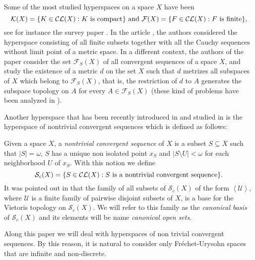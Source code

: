 \documentclass[11pt]{amsart}
\numberwithin{equation}{section}
\theoremstyle{plain}
\theoremstyle{definition}
\theoremstyle{definition}
\theoremstyle{definition}
\theoremstyle{definition}
\theoremstyle{definition}
\begin{document}
\medskip

Some of the most studied hyperspaces on a space $X$ have been
$$
\mathcal{K}(X) = \{K \in \mathcal{CL}(X) : K \textnormal{ is compact}\} \textnormal{ and } \mathcal{F}(X) = \{F \in \mathcal{CL}(X) : F \textnormal{ is finite}\},
$$
see for instance the survey paper \cite{gu}.
In the article \cite{jvpp}, the authors considered the hyperspace consisting of all finite subsets together with all  the Cauchy sequences  without limit point of a metric space.
In a different context,  the authors of the paper \cite{peng} consider the set $\mathcal{F}_S(X)$ of all convergent sequences of a space $X$, and study the existence of a metric $d$ on the set $X$ such that $d$ metrizes all subspaces of $X$ which belong to $\mathcal{F}_S(X)$, that is, the restriction of $d$ to $A$ generates the subspace topology on $A$ for every $A \in \mathcal{F}_S(X)$ (these kind of problems have been analyzed in \cite{arh}).

\medskip

 Another hyperspace that has been recently introduced in \cite{sal-yas} and studied in \cite{may-pat-rob} is the hyperspace of nontrivial convergent sequences which is defined as follows:

\smallskip

 Given a space $X$, a \textit{nontrivial convergent sequence} of $X$ is a subset $S \subseteq X$ such that  $\left|S\right| = \omega$, $S$ has a unique non isolated point $x_S$ and $\left|S \setminus U\right| < \omega$ for each neighborhood $U$ of $x_S$. With this notion we define
$$\mathcal{S}_c(X) = \{S \in \mathcal{CL}(X) : S \textnormal{ is a nontrivial convergent sequence}\}.$$
It was pointed out in \cite{may-pat-rob} that the family of all subsets of $\mathcal{S}_c(X)$ of the form $\left\langle \mathcal{U}\right\rangle$, where $\mathcal{U}$ is a finite family of pairwise disjoint subsets of $X$,  is a base for the Vietoris topology on $\mathcal{S}_c(X)$. We will refer to  this family as the {\it canonical basis} of $\mathcal{S}_c(X)$ and  its elements will be name {\it canonical open sets}.

\medskip

Along this paper we will deal with hyperspaces of non trivial convergent sequences. By this reason, it is natural to consider only  Fr\'echet-Urysohn spaces that are infinite and non-discrete.

\medskip
\end{document}
